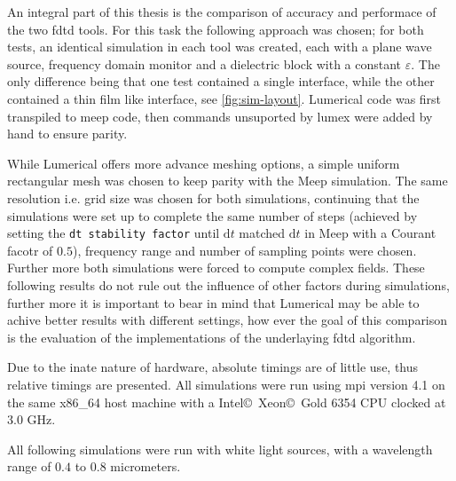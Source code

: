 An integral part of this thesis is the comparison of accuracy and performace of the two \gls{fdtd} tools. For this task the following approach was chosen; for both tests, an identical simulation in each tool was created, each with a plane wave source, frequency domain monitor and a dielectric block with a constant $\varepsilon$. The only difference being that one test contained a single interface, while the other contained a thin film like interface, see \cref{fig:sim-layout}. Lumerical code was first transpiled to meep code, then commands unsuported by \gls{lumex} were added by hand to ensure parity. 

While Lumerical offers more advance meshing options, a simple uniform rectangular mesh was chosen to keep parity with the Meep simulation. The same resolution i.e. grid size was chosen for both simulations, continuing that the simulations were set up to complete the same number of steps (achieved by setting the \texttt{dt stability factor} until $\text{d}t$ matched $\text{d}t$ in Meep with a Courant facotr of $0.5$), frequency range and number of sampling points were chosen. Further more both simulations were forced to compute complex fields. These following results do not rule out the influence of other factors during simulations, further more it is important to bear in mind that Lumerical may be able to achive better results with different settings, how ever the goal of this comparison is the evaluation of the implementations of the underlaying \gls{fdtd} algorithm.

Due to the inate nature of hardware, absolute timings are of little use, thus relative timings are presented. All simulations were run using \gls{mpi} version 4.1 on the same x86\_64 host machine with a Intel\copyright\ Xeon\copyright\ Gold 6354 CPU clocked at 3.0 GHz.

All following simulations were run with white light sources, with a wavelength range of $0.4$ to $0.8$ micrometers.


